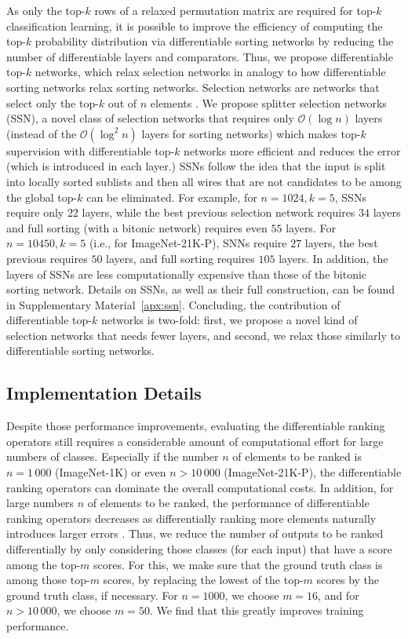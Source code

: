 \documentclass{article}
\begin{document}
As only the top-$k$ rows of a relaxed permutation matrix are required for top-$k$ classification learning, it is possible to improve the efficiency of computing the top-$k$ probability distribution via differentiable sorting networks by reducing the number of differentiable layers and comparators.
Thus, we propose differentiable top-$k$ networks, which relax selection networks in analogy to how differentiable sorting networks relax sorting networks.
Selection networks are networks that select only the top-$k$ out of $n$ elements \citep{Knuth1998-3-SortingSearching}.
We propose splitter selection networks (SSN), a novel class of selection networks that requires only $\mathcal{O}(\log n)$ layers (instead of the $\mathcal{O}(\log^2 n)$ layers for sorting networks) which makes top-$k$ supervision with differentiable top-$k$ networks more efficient and reduces the error (which is introduced in each layer.)
SSNs follow the idea that the input is split into locally sorted sublists and then all wires that are not candidates to be among the global top-$k$ can be eliminated.
For example, for $n=1024, k=5$, SSNs require only $22$ layers, while the best previous selection network requires $34$ layers and full sorting (with a bitonic network) requires even $55$ layers. 
For $n=10450, k=5$ (i.e., for ImageNet-21K-P), SNNs require $27$ layers, the best previous requires $50$ layers, and full sorting requires $105$ layers.
In addition, the layers of SSNs are less computationally expensive than those of the bitonic sorting network.
Details on SSNs, as well as their full construction, can be found in Supplementary Material~\ref{apx:ssn}.
Concluding, the contribution of differentiable top-$k$ networks is two-fold: first, we propose a novel kind of selection networks that needs fewer layers, and second, we relax those similarly to differentiable sorting networks.


\subsection{Implementation Details}
\label{sec:implementation_details}

Despite those performance improvements, evaluating the differentiable ranking operators still requires a considerable amount of computational effort for large numbers of classes. 
Especially if the number $n$ of elements to be ranked is $n=1\,000$ (ImageNet-1K) or even $n>10\,000$ (ImageNet-21K-P), the differentiable ranking operators can dominate the overall computational costs.
In addition, for large numbers $n$ of elements to be ranked, the performance of differentiable ranking operators decreases as differentially ranking more elements naturally introduces larger errors \citep{Grover2019-NeuralSort,prillo2020softsort,Cuturi2019-SortingOT,Petersen2021-diffsort}.
Thus, we reduce the number of outputs to be ranked differentially by only considering those classes (for each input) that have a score among the top-$m$ scores.
For this, we make sure that the ground truth class is among those top-$m$ scores, by replacing the lowest of the top-$m$ scores by the ground truth class, if necessary.
For $n=1000$, we choose $m=16$, and for $n>10\,000$, we choose $m=50$.
We find that this greatly improves training performance.
\end{document}
